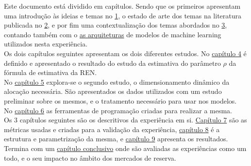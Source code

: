 Este documento está dividido em capítulos. Sendo que os primeiros apresentam uma introdução às ideias e temas no \hyperref[ch:intro]{1}, o estado de arte dos temas na literatura publicada no \hyperref[ch:revisao]{2}, e por fim uma contextualização dos temas abordados no \hyperref[ch:contexto]{3}, contando também com o \hyperref[se:arquiteturas_modelos]{as arquiteturas} de modelos de machine learning utilizados nesta experiência.\\
Os dois capítulos seguintes apresentam os dois diferentes estudos. No \hyperref[ch:estudo_1]{capítulo 4} é definido e apresentado o resultado do estudo da estimativa do parâmetro $\rho$ da fórmula de estimativa da \gls{REN}.\\
No \hyperref[ch:estudo_2]{capítulo 5} explora-se o segundo estudo, o dimensionamento dinâmico da alocação necessária. São apresentados os dados utilizados com um estudo preliminar sobre os mesmos, e o tratamento necessário para usar nos modelos.\\
No \hyperref[ch:ferramentas]{capítulo 6} as ferramentas de programação criadas para realizar a mesma.\\
Os 3 capítulos seguintes são os descritivos da experiência em si. \hyperref[ch:metricas]{Capítulo 7} são as métricas usadas e criadas para a validação da experiência, \hyperref[ch:metodos]{capítulo 8} é a estrutura e parametrização da mesma, e \hyperref[ch:resultados_discussao]{capítulo 9} apresenta os resultados.\\
Termina com um \hyperref[ch:conclusao]{capítulo conclusivo} onde são avaliadas as experiências como um todo, e o seu impacto no âmbito dos mercados de reserva.\\